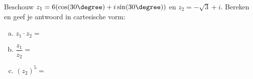 \documentclass[12pt]{article}
\begin{document}
Beschouw $z_1 = 6(\cos(30\degree) + i\sin(30\degree))$ en $z_2 = -\sqrt{3} + i$. Bereken en geef je antwoord in cartesische vorm:
\begin{enumerate}[(a)]
\item $z_1 \cdot z_2=$\arulefill
\item $\dfrac{z_1}{z_2}=$\arulefill
\item $\left( z_2 \right)^5=$\arulefill
\end{enumerate}
\end{document}
